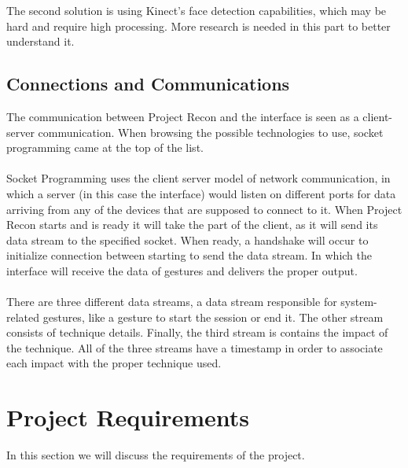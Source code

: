 The second solution is using Kinect's face detection capabilities, which may be hard and require high processing. More research is needed in this part to better understand it.

\subsection{Connections and Communications}
The communication between Project Recon and the interface is seen as a client-server communication. When browsing the possible technologies to use, socket programming came at the top of the list.
\\
\\
Socket Programming uses the client server model of network communication, in which a server (in this case the interface) would listen on different ports for data arriving from any of the devices that are supposed to connect to it. When Project Recon starts and is ready it will take the part of the client, as it will send its data stream to the specified socket. When ready, a handshake will occur to initialize connection between starting to send the data stream. In which the interface will receive the data of gestures and delivers the proper output.
\\
\\
There are three different data streams, a data stream responsible for system-related gestures, like a gesture to start the session or end it. The other stream consists of technique details. Finally, the third stream is contains the impact of the technique. All of the three streams have a timestamp in order to associate each impact with the proper technique used.
\section{Project Requirements}
In this section we will discuss the requirements of the project.
